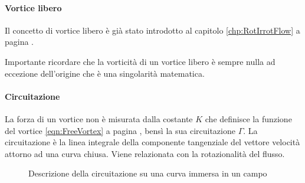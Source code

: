 \paragraph{Vortice libero}
Il concetto di vortice libero è già stato introdotto al capitolo \ref{chp:RotIrrotFlow} a pagina \pageref{chp:RotIrrotFlow}.

Importante ricordare che la vorticità di un vortice libero è sempre nulla ad eccezione dell'origine che è una singolarità matematica.

\paragraph{Circuitazione}
La forza di un vortice non è misurata dalla costante $K$ che definisce la funzione del vortice \eqref{eqn:FreeVortex} a pagina \pageref{eqn:FreeVortex}, bensì la sua circuitazione $\Gamma$.
La circuitazione è la linea integrale della componente tangenziale del vettore velocità attorno ad una curva chiusa. Viene relazionata con la rotazionalità del flusso.

\begin{figure}
\centering
{}\quad
{}
\caption{Descrizione della circuitazione su una curva immersa in un campo}
\end{figure}

